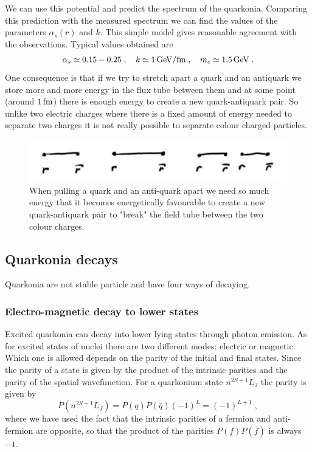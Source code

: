 \documentclass[12pt]{article}
\begin{document}
We can use this potential and predict the spectrum of the quarkonia. Comparing this prediction with the measured spectrum we can find the values of the parameters $\alpha_s(r)$ and $k$. This simple model gives reasonable agreement with the observations. Typical values obtained are 
\[\alpha_s\simeq 0.15-0.25\;,\quad k\simeq 1\,{\rm GeV/fm}\;,\quad m_c\simeq1.5 \,{\rm GeV}\;.\] 
One consequence is that if we try to stretch apart a quark and an antiquark we store more and more energy in the flux tube between them and at some point (around $1\,{\rm fm}$) there is enough energy to create a new quark-antiquark pair. So unlike two electric charges where there is a fixed amount of energy needed to separate two charges it is not really possible to separate colour charged particles.  
\begin{figure}
\begin{center}
\includegraphics[scale=0.4]{images/hadronisation.png}
\caption{When pulling a quark and an anti-quark apart we need so much energy that it becomes energetically favourable to create a new quark-antiquark pair to "break" the field tube between the two colour charges.}\label{fig:hadronisation}
\end{center}
\end{figure} 
\subsection{Quarkonia decays}\label{sec:QuarkoniaDecays}
Quarkonia are not stable particle and have four ways of decaying.
\subsubsection{Electro-magnetic decay to lower states}
Excited quarkonia can decay into lower lying states through photon emission. As for excited states of nuclei there are two different modes: electric or magnetic. Which one is allowed depends on the parity of the initial and final states. Since the parity of a state is given by the product of the intrinsic parities and the parity of the spatial wavefunction. For a quarkonium state $n^{2S+1}L_J$ the parity is given by 
\[P(n^{2S+1}L_J)=P(q)P(\bar q)(-1)^L=(-1)^{L+1}\;,\]
where we have used the fact that the intrinsic parities of a fermion and anti-fermion are opposite, so that the product of the parities $P(f)P(\bar f)$ is always $-1$.  
\end{document}
